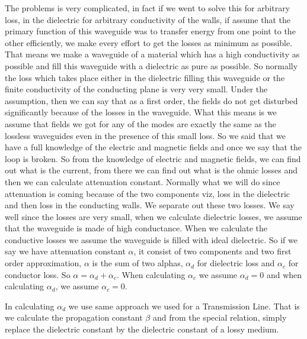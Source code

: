 	The problems is very complicated, in fact if we went to solve this for arbitrary loss, in the dielectric for arbitrary conductivity of the walls, if assume that the primary function of this waveguide was to transfer energy from one point to the other efficiently, we make every effort to get the losses as minimum as possible.
	That means we make a waveguide of a material which has a high conductivity as possible and fill this waveguide with a dielectric as pure as possible. So normally the loss which takes place either in the dielectric filling this waveguide or the finite conductivity of the conducting plane is very very small. Under the assumption, then we can say that as a first order, the fields do not get disturbed significantly because of the losses in the waveguide. What this means is we assume that fields we got for any of the modes are exactly the same as the lossless waveguides even in the presence of this small loss.
	So we said that we have a full knowledge of the electric and magnetic fields and once we say that the loop is broken. So from the knowledge of electric and magnetic fields, we can find out what is the current, from there we can find out what is the ohmic losses and then we can calculate attenuation constant. Normally what we will do since attenuation is coming because of the two components viz, loss in the dielectric and then loss in the conducting walls. We separate out these two losses. We say well since the losses are very small, when we calculate dielectric losses, we assume that the waveguide is made of high conductance. When we calculate the conductive losses we assume the waveguide is filled with ideal dielectric. So if we say we have attenuation constant $\alpha$, it consist of two components and two first order approximation, $\alpha$ is the sum of two alphas, $\alpha_{d}$ for dielectric loss and  $\alpha_{c}$ for conductor loss. So $\alpha =  \alpha_{d} +  \alpha_{c}$. When calculating $\alpha_{c}$ we assume  $\alpha_{d} = 0$ and when calculating  $\alpha_{d}$, we assume  $\alpha_{c} = 0$.
		
	In calculating  $\alpha_{d}$ we use same approach we used for a Transmission Line. That is we calculate the propagation constant $\beta$ and from the special relation, simply replace the dielectric constant by the dielectric constant of a lossy medium.

